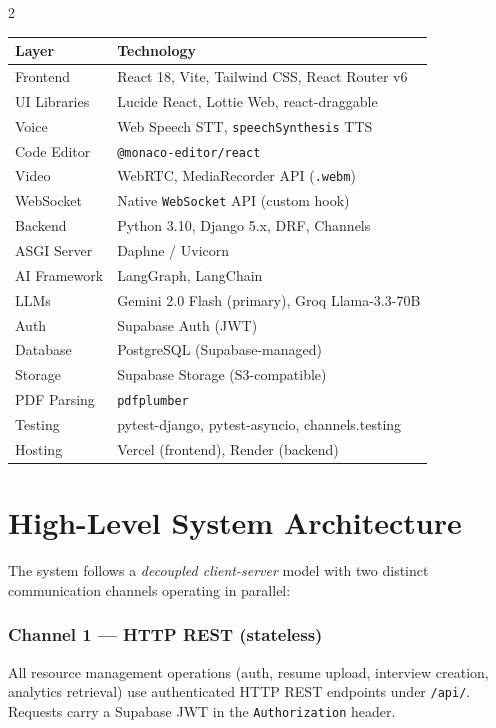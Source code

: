 \documentclass[10pt, a4paper]{article}
\begin{document}
\begin{multicols}{2}
\begin{center}
\small\color{monodark}
\begin{tabular}{@{}p{1.8cm} p{4.5cm}@{}}
\toprule
\textbf{Layer} & \textbf{Technology} \\
\midrule
Frontend     & React 18, Vite, Tailwind CSS, React Router v6 \\
UI Libraries & Lucide React, Lottie Web, react-draggable \\
Voice        & Web Speech STT, \texttt{speechSynthesis} TTS \\
Code Editor  & \texttt{@monaco-editor/react} \\
Video        & WebRTC, MediaRecorder API (\texttt{.webm}) \\
WebSocket    & Native \texttt{WebSocket} API (custom hook) \\
Backend      & Python 3.10, Django 5.x, DRF, Channels \\
ASGI Server  & Daphne / Uvicorn \\
AI Framework & LangGraph, LangChain \\
LLMs         & Gemini 2.0 Flash (primary), Groq Llama-3.3-70B \\
Auth         & Supabase Auth (JWT) \\
Database     & PostgreSQL (Supabase-managed) \\
Storage      & Supabase Storage (S3-compatible) \\
PDF Parsing  & \texttt{pdfplumber} \\
Testing      & pytest-django, pytest-asyncio, channels.testing \\
Hosting      & Vercel (frontend), Render (backend) \\
\bottomrule
\end{tabular}
\end{center}

\section{High-Level System Architecture}

The system follows a \textit{decoupled client-server} model with two distinct
communication channels operating in parallel:

\subsubsection{Channel 1 --- HTTP REST (stateless)}
All resource management operations (auth, resume upload, interview
creation, analytics retrieval) use authenticated HTTP REST endpoints under
\texttt{/api/}. Requests carry a Supabase JWT in the \texttt{Authorization}
header.


\end{multicols}
\end{document}
